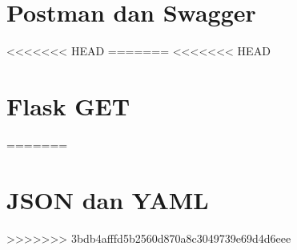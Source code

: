 \documentclass{wileySix}
\begin{document}
%

%

\chapter[Postman dan Swagger]
{Postman dan Swagger}



%


%

<<<<<<< HEAD
%
=======
<<<<<<< HEAD
\chapter[Flask GET]
{Flask GET}



=======
\chapter[Json dan YAML]
{JSON dan YAML}

>>>>>>> 3bdb4afffd5b2560d870a8c3049739e69d4d6eee

%
\end{document}
